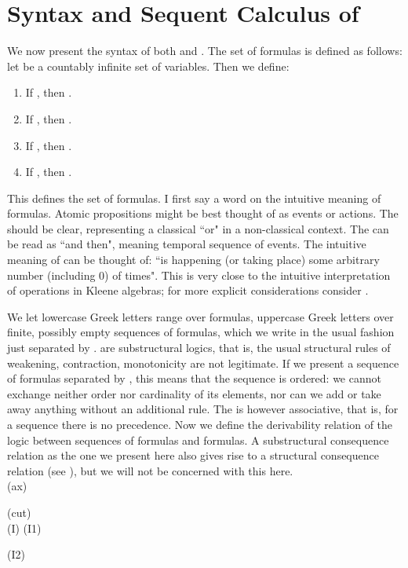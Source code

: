 \documentclass{eptcs}
\begin{document}
\section{Syntax and Sequent Calculus of }

We now present the syntax of both  and . 
 The set of formulas is defined as follows:
let  be a countably infinite set of variables. Then
we define:
\begin{enumerate}
\item If , then .
\item If , then .
\item If , then .
\item If , then .
\end{enumerate}

This defines the set of formulas. I first say a word on the
intuitive meaning of formulas. Atomic propositions might be best
thought of as events or actions. The  should be clear,
representing a classical ``or" in a non-classical context. The 
can be read as ``and then", meaning temporal sequence of events. The
intuitive meaning of  can be thought of: ``is happening (or taking place)
some arbitrary number (including 0) of times". This is very close
to the intuitive interpretation of operations in Kleene algebras;
for more explicit considerations consider \cite{pratt:action}.

We let lowercase Greek letters range over formulas, uppercase
Greek letters over finite, possibly empty sequences of 
formulas,
which we write in the usual fashion just separated by
.  are substructural logics, that is, the usual
structural rules of weakening, contraction, monotonicity are
not legitimate. If we
present a sequence of formulas separated by , this means that the
sequence is ordered: we cannot exchange neither order nor 
cardinality of its elements, nor can we add or take away anything without an
additional rule. The
 is however associative, that is, 
for a sequence 
there is no precedence.
Now we define the derivability relation 
 of the logic  between sequences of formulas and
formulas. A substructural consequence relation as the one we
present here also gives rise to a structural consequence
relation (see \cite{galatos:residuated}), but we will not be
concerned with this here.
\\

(ax) 
 
(cut) 
\\

(I) 
 (I1) 

(I2) 
\\
\end{document}
